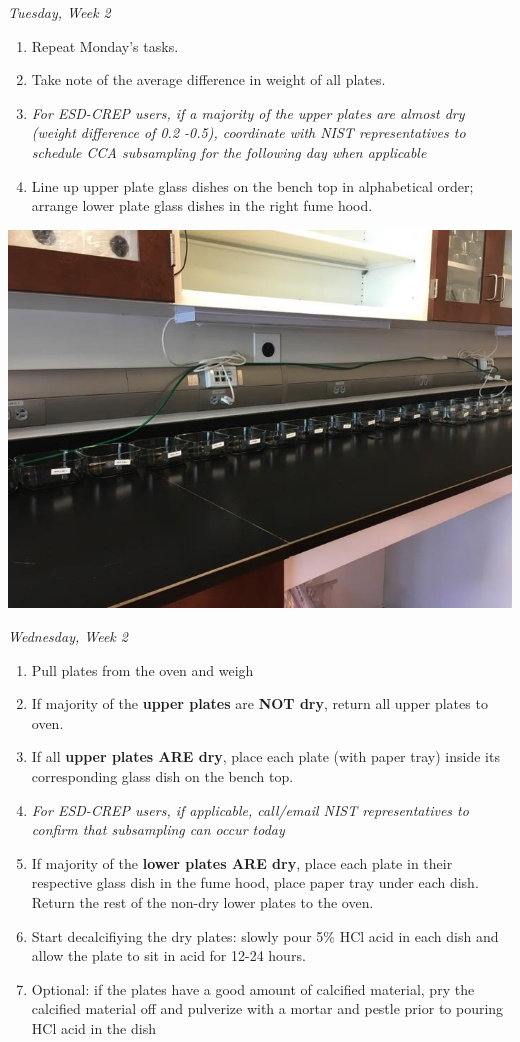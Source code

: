 \documentclass[]{book}
\providecommand{\tightlist}{%
  \setlength{\itemsep}{0pt}\setlength{\parskip}{0pt}}
\begin{document}
\emph{Tuesday, Week 2}

\begin{enumerate}
\def\labelenumi{\arabic{enumi}.}
\tightlist
\item
  Repeat Monday's tasks.
\item
  Take note of the average difference in weight of all plates.
\item
  \emph{For ESD-CREP users, if a majority of the upper plates are almost dry (weight difference of 0.2 -0.5), coordinate with NIST representatives to schedule CCA subsampling for the following day when applicable}
\item
  Line up upper plate glass dishes on the bench top in alphabetical order; arrange lower plate glass dishes in the right fume hood.
\end{enumerate}

\includegraphics{images/DailyTasks8.jpg}

\emph{Wednesday, Week 2}

\begin{enumerate}
\def\labelenumi{\arabic{enumi}.}
\tightlist
\item
  Pull plates from the oven and weigh
\item
  If majority of the \textbf{upper plates} are \textbf{NOT dry}, return all upper plates to oven.
\item
  If all \textbf{upper plates ARE dry}, place each plate (with paper tray) inside its corresponding glass dish on the bench top.
\item
  \emph{For ESD-CREP users, if applicable, call/email NIST representatives to confirm that subsampling can occur today}
\item
  If majority of the \textbf{lower plates ARE dry}, place each plate in their respective glass dish in the fume hood, place paper tray under each dish. Return the rest of the non-dry lower plates to the oven.
\item
  Start decalcifiying the dry plates: slowly pour 5\% HCl acid in each dish and allow the plate to sit in acid for 12-24 hours.
\item
  Optional: if the plates have a good amount of calcified material, pry the calcified material off and pulverize with a mortar and pestle prior to pouring HCl acid in the dish
\end{enumerate}
\end{document}
